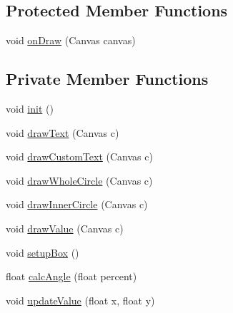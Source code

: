 \subsection*{Protected Member Functions}
\begin{DoxyCompactItemize}
\item 
void \hyperlink{classcs_1_1nsense_1_1_circle_display_a821b7c71dfe1c44efd4c6ca5f0cd12d1}{on\-Draw} (Canvas canvas)
\end{DoxyCompactItemize}
\subsection*{Private Member Functions}
\begin{DoxyCompactItemize}
\item 
void \hyperlink{classcs_1_1nsense_1_1_circle_display_a3dbfcdc07b21b4c75e6610e9ccdddebb}{init} ()
\item 
void \hyperlink{classcs_1_1nsense_1_1_circle_display_a1a79e99b4f717ac715b3dce2420ef6ac}{draw\-Text} (Canvas c)
\item 
void \hyperlink{classcs_1_1nsense_1_1_circle_display_aa0a7a2270c5417bbcbf91c9ad0cc6b37}{draw\-Custom\-Text} (Canvas c)
\item 
void \hyperlink{classcs_1_1nsense_1_1_circle_display_a82c47d64b9a0c2b2e041f25c416142ed}{draw\-Whole\-Circle} (Canvas c)
\item 
void \hyperlink{classcs_1_1nsense_1_1_circle_display_a85d3ecf657d909313a0b1a8f57b421f5}{draw\-Inner\-Circle} (Canvas c)
\item 
void \hyperlink{classcs_1_1nsense_1_1_circle_display_a16f4a3b6d12f4bc645d98781b215ded2}{draw\-Value} (Canvas c)
\item 
void \hyperlink{classcs_1_1nsense_1_1_circle_display_a4fc72aac780d9a2e7046f9f36620aa43}{setup\-Box} ()
\item 
float \hyperlink{classcs_1_1nsense_1_1_circle_display_a94a0bc40826797d8c7a4f49dcb5b5707}{calc\-Angle} (float percent)
\item 
void \hyperlink{classcs_1_1nsense_1_1_circle_display_a0591dfdabf758071d691cc9e4471079b}{update\-Value} (float x, float y)
\end{DoxyCompactItemize}
